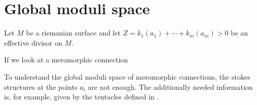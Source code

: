 \chapter{Global moduli space}
\TODO[Remove?!]
Let $M$ be a riemanian surface and let $Z=k_1(a_1)+\cdots+k_m(a_m)>0$ be an
effective divisor on $M$.

If we look at a meromorphic connection \TODO[\dots]

To understand the global moduli space of meromorphic connections, the stokes
structures at the points $a_i$ are not enough. The additionally needed
information is, for example, given by the tentacles defined in
\cite[Chap.4]{thboalch}.
